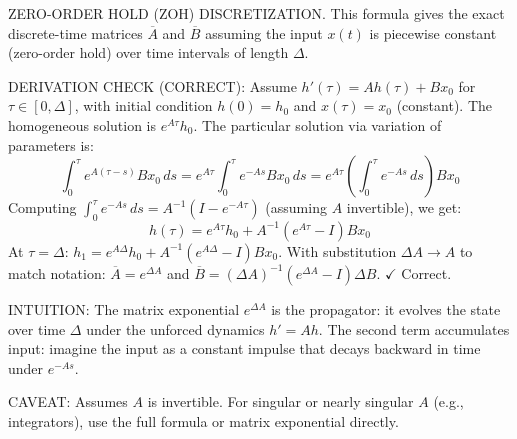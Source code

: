 \begin{ThomasAnnotation}
  ZERO-ORDER HOLD (ZOH) DISCRETIZATION. This formula gives the exact discrete-time matrices $\overline{A}$ and $\overline{B}$ assuming the input $x(t)$ is piecewise constant (zero-order hold) over time intervals of length $\Delta$.
  
  DERIVATION CHECK (CORRECT): Assume $h'(\tau) = Ah(\tau) + Bx_0$ for $\tau \in [0, \Delta]$, with initial condition $h(0) = h_0$ and $x(\tau) = x_0$ (constant). The homogeneous solution is $e^{A\tau}h_0$. The particular solution via variation of parameters is:
  $$\int_0^\tau e^{A(\tau-s)} Bx_0 \, ds = e^{A\tau} \int_0^\tau e^{-As} Bx_0 \, ds = e^{A\tau}\left(\int_0^\tau e^{-As}\,ds\right)Bx_0$$
  Computing $\int_0^\tau e^{-As}\,ds = A^{-1}(I - e^{-A\tau})$ (assuming $A$ invertible), we get:
  $$h(\tau) = e^{A\tau}h_0 + A^{-1}(e^{A\tau} - I)Bx_0$$
  At $\tau = \Delta$: $h_1 = e^{A\Delta}h_0 + A^{-1}(e^{A\Delta} - I)Bx_0$. With substitution $\Delta A \to A$ to match notation: $\overline{A} = e^{\Delta A}$ and $\overline{B} = (\Delta A)^{-1}(e^{\Delta A} - I)\Delta B$. $\checkmark$ Correct.
  
  INTUITION: The matrix exponential $e^{\Delta A}$ is the propagator: it evolves the state over time $\Delta$ under the unforced dynamics $h' = Ah$. The second term accumulates input: imagine the input as a constant impulse that decays backward in time under $e^{-As}$.
  
  CAVEAT: Assumes $A$ is invertible. For singular or nearly singular $A$ (e.g., integrators), use the full formula or matrix exponential directly.
\end{ThomasAnnotation}

